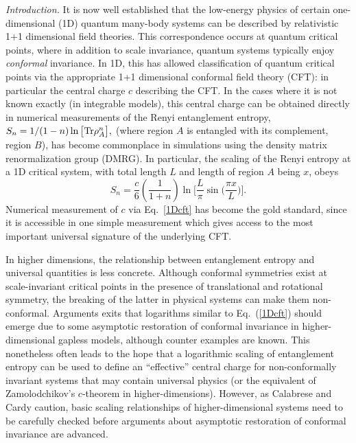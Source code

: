 \documentclass[prl,aps,twocolumn,floatfix,amsmath,amssymb,superscriptaddress,tightenlines]{revtex4}
\begin{document}
{\it Introduction.} It is now well established that the low-energy physics of certain one-dimensional (1D) quantum many-body systems can be described by relativistic 1+1 dimensional field theories.  This correspondence occurs at quantum critical points, where in addition to scale invariance, quantum systems typically enjoy {\it conformal} invariance.  In 1D, this has allowed classification of quantum critical points via the appropriate 1+1 dimensional conformal field theory (CFT): in particular the central charge $c$ describing the CFT.
In the cases where it is not known exactly (in integrable models), 
this central charge can be obtained directly in numerical measurements of the Renyi entanglement entropy,
$
S_n = 1/(1-n) \ln \big[ {\rm Tr} \rho_A^n \big],
$
(where region $A$ is entangled with its complement, region $B$), has become commonplace in simulations using the density matrix renormalization group (DMRG).  In particular, the
scaling of the Renyi entropy at a 1D critical system, with total length $L$ and length of region $A$ being $x$, obeys
\begin{equation}
S_n = \frac{c}{6}\left({ \frac{1}{1+n} }\right) \ln\Big[ \frac{L}{\pi} \sin\big( \frac{\pi x}{L} \big) \Big]. \label{1Dcft}
\end{equation}
Numerical measurement of $c$ via Eq.~\ref{1Dcft} has become the gold standard, since it is accessible in one simple measurement which gives access to the most important universal signature of the underlying CFT.

In higher dimensions, the relationship between entanglement entropy and universal quantities is less concrete.  Although conformal symmetries exist at scale-invariant critical points in the presence of translational and rotational symmetry, the breaking of the latter in physical systems can make them non-conformal.  Arguments exits that logarithms similar to Eq.~(\ref{1Dcft}) should emerge due to some asymptotic restoration of conformal invariance in higher-dimensional gapless models, although counter examples are known.  This nonetheless often leads to the hope that a logarithmic scaling of entanglement entropy can be used to define an ``effective'' central charge for non-conformally invariant systems that may contain universal physics (or the equivalent of Zamolodchikov's $c$-theorem in higher-dimensions).
However, as Calabrese and Cardy caution, basic scaling relationships of higher-dimensional systems need to be carefully checked before
arguments about asymptotic restoration of conformal invariance are advanced.  
\end{document}

